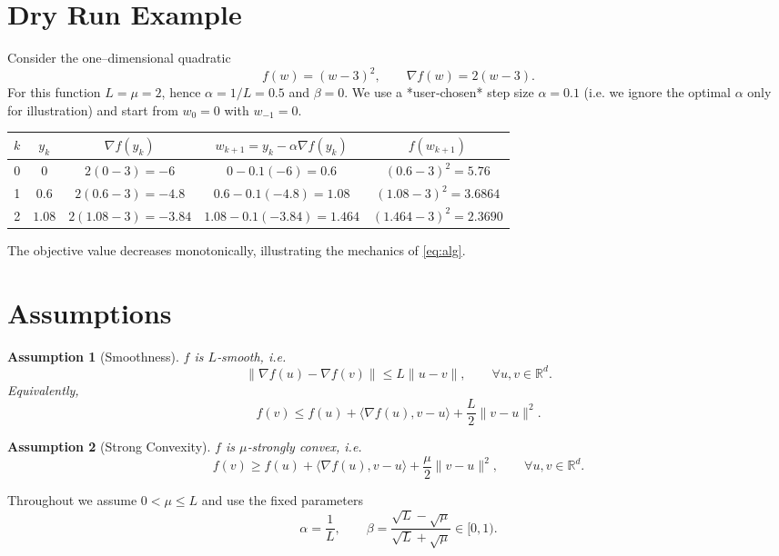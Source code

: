 \documentclass{article}
\newtheorem{assumption}{Assumption}
\begin{document}
\section*{Dry Run Example}
Consider the one–dimensional quadratic
\[
f(w) = (w-3)^{2},\qquad \nabla f(w)=2(w-3).
\]
For this function $L=\mu=2$, hence $\alpha=1/L=0.5$ and $\beta=0$.  
We use a *user‑chosen* step size $\alpha=0.1$ (i.e. we ignore the optimal $\alpha$ only for illustration) and start from $w_{0}=0$ with $w_{-1}=0$.

\begin{center}
\begin{tabular}{c|c|c|c|c}
$k$ & $y_{k}$ & $\nabla f(y_{k})$ & $w_{k+1}=y_{k}-\alpha\nabla f(y_{k})$ & $f(w_{k+1})$ \\ \hline
0 & $0$ & $2(0-3)=-6$ & $0-0.1(-6)=0.6$ & $(0.6-3)^{2}=5.76$ \\ 
1 & $0.6$ & $2(0.6-3)=-4.8$ & $0.6-0.1(-4.8)=1.08$ & $(1.08-3)^{2}=3.6864$ \\ 
2 & $1.08$ & $2(1.08-3)=-3.84$ & $1.08-0.1(-3.84)=1.464$ & $(1.464-3)^{2}=2.3690$ \\ 
\end{tabular}
\end{center}
The objective value decreases monotonically, illustrating the mechanics of \eqref{eq:alg}.

\section*{Assumptions}
\begin{assumption}[Smoothness]\label{ass:smooth}
$f$ is $L$‑smooth, i.e.
\[
\|\nabla f(u)-\nabla f(v)\|\le L\|u-v\|,\qquad \forall u,v\in\mathbb{R}^{d}.
\tag{A1}
\]
Equivalently,
\[
f(v)\le f(u)+\langle\nabla f(u),v-u\rangle+\frac{L}{2}\|v-u\|^{2}.
\tag{A1'}
\]
\end{assumption}
\begin{assumption}[Strong Convexity]\label{ass:strong}
$f$ is $\mu$‑strongly convex, i.e.
\[
f(v)\ge f(u)+\langle\nabla f(u),v-u\rangle+\frac{\mu}{2}\|v-u\|^{2},
\qquad \forall u,v\in\mathbb{R}^{d}.
\tag{A2}
\]
\end{assumption}
Throughout we assume $0<\mu\le L$ and use the fixed parameters
\[
\alpha=\frac{1}{L},\qquad 
\beta=\frac{\sqrt{L}-\sqrt{\mu}}{\sqrt{L}+\sqrt{\mu}}\in[0,1).
\tag{A3}
\]

\end{document}
